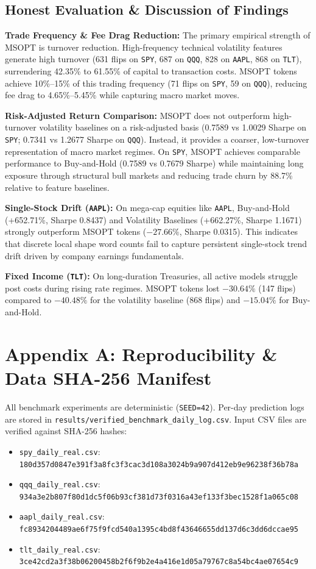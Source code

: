 \documentclass[10pt,journal,compsoc]{IEEEtran}
\begin{document}
\subsection{Honest Evaluation \& Discussion of Findings}

\textbf{Trade Frequency \& Fee Drag Reduction:} The primary empirical strength of MSOPT is turnover reduction. High-frequency technical volatility features generate high turnover (631 flips on \texttt{SPY}, 687 on \texttt{QQQ}, 828 on \texttt{AAPL}, 868 on \texttt{TLT}), surrendering 42.35\% to 61.55\% of capital to transaction costs. MSOPT tokens achieve 10\%--15\% of this trading frequency (71 flips on \texttt{SPY}, 59 on \texttt{QQQ}), reducing fee drag to 4.65\%--5.45\% while capturing macro market moves.

\textbf{Risk-Adjusted Return Comparison:} MSOPT does not outperform high-turnover volatility baselines on a risk-adjusted basis (0.7589 vs 1.0029 Sharpe on \texttt{SPY}; 0.7341 vs 1.2677 Sharpe on \texttt{QQQ}). Instead, it provides a coarser, low-turnover representation of macro market regimes. On \texttt{SPY}, MSOPT achieves comparable performance to Buy-and-Hold (0.7589 vs 0.7679 Sharpe) while maintaining long exposure through structural bull markets and reducing trade churn by 88.7\% relative to feature baselines.

\textbf{Single-Stock Drift (\texttt{AAPL}):} On mega-cap equities like \texttt{AAPL}, Buy-and-Hold (+652.71\%, Sharpe 0.8437) and Volatility Baselines (+662.27\%, Sharpe 1.1671) strongly outperform MSOPT tokens ($-27.66\%$, Sharpe 0.0315). This indicates that discrete local shape word counts fail to capture persistent single-stock trend drift driven by company earnings fundamentals.

\textbf{Fixed Income (\texttt{TLT}):} On long-duration Treasuries, all active models struggle post costs during rising rate regimes. MSOPT tokens lost $-30.64\%$ (147 flips) compared to $-40.48\%$ for the volatility baseline (868 flips) and $-15.04\%$ for Buy-and-Hold.

\section*{Appendix A: Reproducibility \& Data SHA-256 Manifest}
All benchmark experiments are deterministic (\texttt{SEED=42}). Per-day prediction logs are stored in \texttt{results/verified\_benchmark\_daily_log.csv}. Input CSV files are verified against SHA-256 hashes:
\begin{itemize}
    \item \texttt{spy\_daily_real.csv}: \texttt{180d357d0847e391f3a8fc3f3cac3d108a3024b9a907d412eb9e96238f36b78a}
    \item \texttt{qqq\_daily_real.csv}: \texttt{934a3e2b807f80d1dc5f06b93cf381d73f0316a43ef133f3bec1528f1a065c08}
    \item \texttt{aapl\_daily_real.csv}: \texttt{fc8934204489ae6f75f9fcd540a1395c4bd8f43646655dd137d6c3dd6dccae95}
    \item \texttt{tlt\_daily_real.csv}: \texttt{3ce42cd2a3f38b06200458b2f6f9b2e4a416e1d05a79767c8a54bc4ae07654c9}
\end{itemize}



\end{document}
